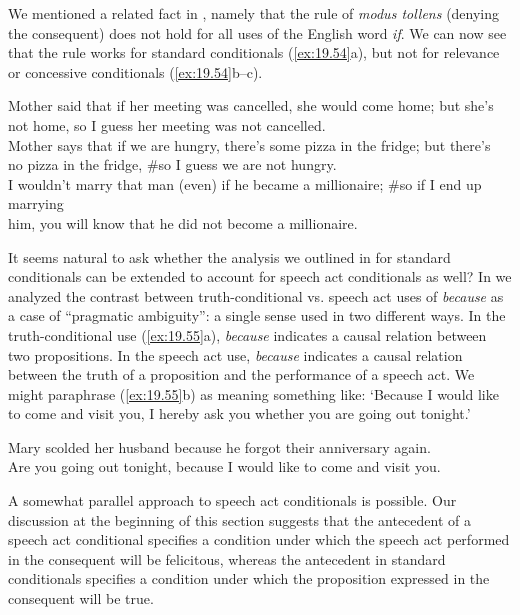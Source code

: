 We mentioned a related fact in , namely that the rule of \textit{modus tollens} (denying the consequent) does not hold for all uses of the English word \textit{if}. We can now see that the rule works for standard conditionals (\ref{ex:19.54}a), but not for relevance or concessive conditionals (\ref{ex:19.54}b--c).


\ea \label{ex:19.54}
\ea  Mother said that if her meeting was cancelled, she would come home; but she’s\\
  not home, so I guess her meeting was not cancelled.\\
\ex Mother says that if we are hungry, there’s some pizza in the fridge; but there’s\\
  no pizza in the fridge, \#so I guess we are not hungry.\\
\ex I wouldn’t marry that man (even) if he became a millionaire; \#so if I end up marrying\\
  him, you will know that he did not become a millionaire.
                       \z
\z


It seems natural to ask whether the analysis we outlined in  for standard conditionals can be extended to account for speech act conditionals as well? In  we analyzed the contrast between truth-conditional vs. speech act uses of \textit{because} as a case of “pragmatic ambiguity”: a single sense used in two different ways. In the truth-conditional use (\ref{ex:19.55}a), \textit{because} indicates a causal relation between two propositions. In the speech act use, \textit{because} indicates a causal relation between the truth of a proposition and the performance of a speech act. We might paraphrase (\ref{ex:19.55}b) as meaning something like: ‘Because I would like to come and visit you, I hereby ask you whether you are going out tonight.’


\ea \label{ex:19.55}
\ea  Mary scolded her husband because he forgot their anniversary again.\\
\ex Are you going out tonight, because I would like to come and visit you.
                       \z
\z


A somewhat parallel approach to speech act conditionals is possible. Our discussion at the beginning of this section suggests that the antecedent of a speech act conditional specifies a condition under which the speech act performed in the consequent will be felicitous, whereas the antecedent in standard conditionals specifies a condition under which the proposition expressed in the consequent will be true.


